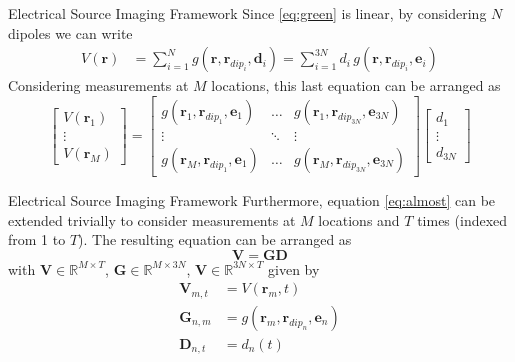 \documentclass[progressbar=head]{beamer}
\newcommand{\ppar}[1]{ \left( #1 \right) }
\newcommand{\R}{\mathbb{R}}
\newcommand{\rr}{\mathbf{r}}
\begin{document}
\begin{frame}{Electrical Source Imaging Framework}
Since \eqref{eq:green} is linear, 
by considering $N$ dipoles we can write
\begin{align}
V\ppar{\rr} &=
\sum_{i=1}^N g\ppar{\rr, \rr_{dip_i}, \mathbf{d}_i}
=
\sum_{i=1}^{3N} d_i\, g\ppar{\rr, \rr_{dip_i}, \mathbf{e}_i}
\end{align}
Considering measurements at $M$ locations, this last equation can be arranged as
\begin{equation}
    \begin{bmatrix}
        V\ppar{\rr_1} \\
        \vdots \\
        V\ppar{\rr_M}
    \end{bmatrix}
    =
    \begin{bmatrix}
        g\ppar{\rr_1, \rr_{dip_1}, \mathbf{e}_1}
        &
        \hdots 
        &
        g\ppar{\rr_1, \rr_{dip_{3N}}, \mathbf{e}_{3N}}
        \\
        \vdots & \ddots & \vdots 
        \\
        g\ppar{\rr_M, \rr_{dip_1}, \mathbf{e}_1}
        &
        \hdots 
        &
        g\ppar{\rr_M, \rr_{dip_{3N}}, \mathbf{e}_{3N}}
    \end{bmatrix}
    \begin{bmatrix}
        d_1 \\ \vdots \\ d_{3N}
    \end{bmatrix}
    \label{eq:almost}
\end{equation}
\end{frame}

\begin{frame}{Electrical Source Imaging Framework}
Furthermore, equation \eqref{eq:almost} can be extended trivially to
consider measurements at $M$ locations and $T$ times (indexed from 1 to $T$). The resulting equation can be arranged as
\begin{equation}
    \mathbf{V} = \mathbf{G} \mathbf{D}
    \label{eq:primitive}
\end{equation}
with $\mathbf{V}\in\R^{M\times T}$, $\mathbf{G}\in \R^{M\times 3N}$, $\mathbf{V}\in \R^{3N\times T}$ given by
\begin{align*}
    \mathbf{V}_{m,t} &= V\ppar{\rr_m, t}
    \\
    \mathbf{G}_{n,m} &=
    g\ppar{\rr_m, \rr_{dip_{n}}, \mathbf{e}_{n}}
    \\
    \mathbf{D}_{n,t}
    &=
    d_n(t)
\end{align*}
\end{frame}
\end{document}

